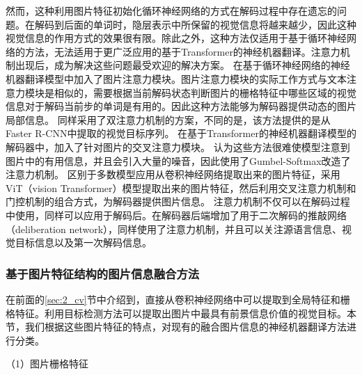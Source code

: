 然而，这种利用图片特征初始化循环神经网络的方式在解码过程中存在遗忘的问题。在解码到后面的单词时，隐层表示中所保留的视觉信息将越来越少，因此这种视觉信息的作用方式的效果很有限。除此之外，这种方法仅适用于基于循环神经网络的方法，无法适用于更广泛应用的基于Transformer的神经机器翻译。注意力机制出现后，成为解决这些问题最受欢迎的解决方案。
在基于循环神经网络的神经机器翻译模型中加入了图片注意力模块。图片注意力模块的实际工作方式与文本注意力模块是相似的，需要根据当前解码状态判断图片的栅格特征中哪些区域的视觉信息对于解码当前步的单词是有用的。因此这种方法能够为解码器提供动态的图片局部信息。
同样采用了双注意力机制的方案，不同的是，该方法提供的是从Faster R-CNN中提取的视觉目标序列。
在基于Transformer的神经机器翻译模型的解码器中，加入了针对图片的交叉注意力模块。
认为这些方法很难使模型注意到图片中的有用信息，并且会引入大量的噪音，因此使用了Gumbel-Softmax改造了注意力机制。
区别于多数模型应用从卷积神经网络提取出来的图片特征，采用ViT（vision Transformer）模型提取出来的图片特征，然后利用交叉注意力机制和门控机制的组合方式，为解码器提供图片信息。
注意力机制不仅可以在解码过程中使用，同样可以应用于解码后。在解码器后端增加了用于二次解码的推敲网络（deliberation network），同样使用了注意力机制，并且可以关注源语言信息、视觉目标信息以及第一次解码信息。

\subsubsection{基于图片特征结构的图片信息融合方法}
在前面的\ref{sec:2_cv}节中介绍到，直接从卷积神经网络中可以提取到全局特征和栅格特征。利用目标检测方法可以提取出图片中最具有前景信息价值的视觉目标。本节，我们根据这些图片特征的特点，对现有的融合图片信息的神经机器翻译方法进行分类。

{\sffamily （1）图片栅格特征}

